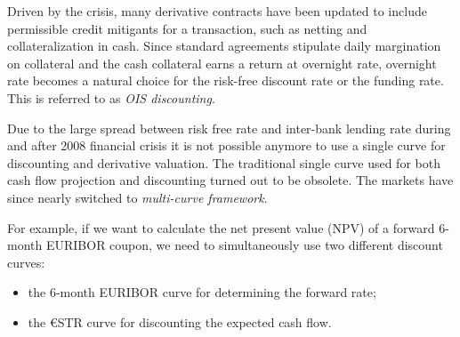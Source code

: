 Driven by the crisis, many derivative contracts have been updated to include permissible credit mitigants for a transaction, such as netting and collateralization in cash. Since standard agreements stipulate daily margination on collateral and the cash collateral earns a return at overnight rate, overnight rate becomes a natural choice for the risk-free discount rate or the funding rate. This is referred to as \emph{OIS discounting}.

Due to the large spread between risk free rate and inter-bank lending rate during and after 2008 financial crisis it is not possible anymore to use a single curve for discounting and derivative valuation. The traditional single curve used for both cash flow projection and discounting turned out to be obsolete. The markets have since nearly switched to \emph{multi-curve framework}. 

For example, if we want to calculate the net present value (NPV) of a forward 6-month EURIBOR coupon, we need to simultaneously use two different discount curves: 

\begin{itemize}
\tightlist
\item the 6-month EURIBOR curve for determining the forward rate;
\item the \euro STR curve for discounting the expected cash flow.
\end{itemize}


